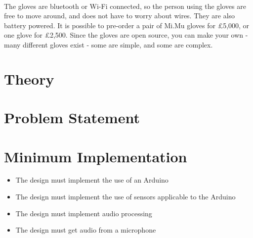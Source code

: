 \begin{minipage}{\linewidth}%
\label{mimu}
\end{minipage}\\

The gloves are bluetooth or Wi-Fi connected, so the person using the gloves are free to move around, and does not have to worry about wires. They are also battery powered. It is possible to pre-order a pair of Mi.Mu gloves for £5,000, or one glove for £2,500. 
Since the gloves are open source, you can make your own - many different gloves exist - some are simple, and some are complex.

\section{Theory}


\section{Problem Statement}


\section{Minimum Implementation}
\begin{itemize}
	\item The design must implement the use of an Arduino
	\item The design must implement the use of sensors applicable to the Arduino
	\item The design must implement audio processing
	\item The design must get audio from a microphone
\end{itemize}

